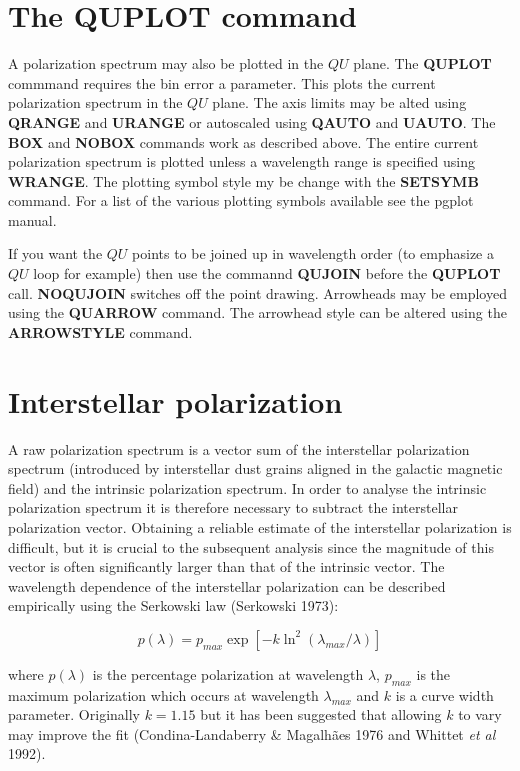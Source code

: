 \section{The QUPLOT command}

A polarization spectrum may also be plotted in the $QU$ plane. The
{\bf QUPLOT} commmand requires the bin error a parameter. This plots
the current polarization spectrum in the $QU$ plane. The axis limits
may be alted using {\bf QRANGE} and {\bf URANGE} or autoscaled using
{\bf QAUTO} and {\bf UAUTO}. The {\bf BOX} and {\bf NOBOX} commands
work as described above. The entire current polarization spectrum is
plotted unless a wavelength range is specified using {\bf WRANGE}. The
plotting symbol style my be change with the {\bf SETSYMB} command. For
a list of the various plotting symbols available see the {\sc pgplot}
manual.

If you want the $QU$ points to be joined up in wavelength order (to
emphasize a $QU$ loop for example) then use the commannd {\bf QUJOIN}
before the {\bf QUPLOT} call. {\bf NOQUJOIN} switches off the point
drawing. Arrowheads may be employed using the {\bf QUARROW} command.
The arrowhead style can be altered using the {\bf ARROWSTYLE} command.

\section{Interstellar polarization}

A raw polarization spectrum is a vector sum of the interstellar polarization
spectrum (introduced by interstellar dust grains aligned in the galactic
magnetic field) and the intrinsic polarization spectrum. In order to analyse
the intrinsic polarization spectrum it is therefore necessary to subtract the
interstellar polarization vector. Obtaining a reliable estimate of the
interstellar polarization is difficult, but it is crucial to the
subsequent analysis since the magnitude of this vector is often significantly
larger than that of the intrinsic vector. The wavelength dependence of the
interstellar polarization can be described empirically using the Serkowski law
(Serkowski 1973):

\begin{equation}
\label{serk}
p(\lambda)=p_{max} \exp [-k\ln^2 (\lambda_{max} / \lambda)]
\end{equation}

where $p(\lambda)$ is the percentage polarization at wavelength $\lambda$,
$p_{max}$ is the maximum polarization which occurs at wavelength
$\lambda_{max}$ and $k$ is a curve width parameter. Originally $k=1.15$ but it
has been suggested that allowing $k$ to vary may improve the fit
(Condina-Landaberry \& Magalh\~{a}es 1976 and Whittet {\it et al} 1992).

